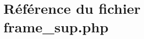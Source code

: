 \hypertarget{frame__sup_8php}{
\section{R\'{e}f\'{e}rence du fichier frame\_\-sup.php}
\label{frame__sup_8php}
}
